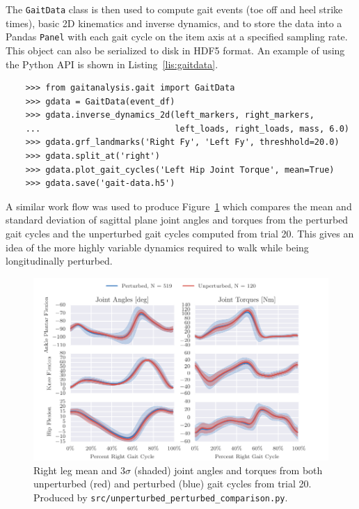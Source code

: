 \documentclass[fleqn,12pt]{wlpeerj}
\begin{document}
The \verb|GaitData| class is then used to compute gait events (toe off and heel
strike times), basic 2D kinematics and inverse dynamics, and to store the data
into a Pandas \verb|Panel| with each gait cycle on the item axis at a specified
sampling rate. This object can also be serialized to disk in HDF5 format. An
example of using the Python API is shown in Listing~\ref{lis:gaitdata}.
%
\begin{listing}
  \begin{verbatim}
    >>> from gaitanalysis.gait import GaitData
    >>> gdata = GaitData(event_df)
    >>> gdata.inverse_dynamics_2d(left_markers, right_markers,
    ...                           left_loads, right_loads, mass, 6.0)
    >>> gdata.grf_landmarks('Right Fy', 'Left Fy', threshhold=20.0)
    >>> gdata.split_at('right')
    >>> gdata.plot_gait_cycles('Left Hip Joint Torque', mean=True)
    >>> gdata.save('gait-data.h5')
  \end{verbatim}
  \cprotect\caption{Python interpreter session showing how one could use the
    \verb|GaitData| class to load in the result of \verb|DFlowData| and compute
    the inverse dynamics (joint angles and torques), identify the gait events
    (e.g. heel strikes), split the data with respect to the gait events into a
    Pandas \verb|Panel|, plot the mean and standard deviation of one time
    history with respect to the gait cycles, and save the data to disk.}
  \label{lis:gaitdata}
\end{listing}

A similar work flow was used to produce Figure~\ref{fig:angle-torque-comparison}
which compares the mean and standard deviation of sagittal plane joint angles
and torques from the perturbed gait cycles and the unperturbed gait cycles
computed from trial 20. This gives an idea of the more highly variable dynamics
required to walk while being longitudinally perturbed.
%
\begin{figure}
  \centering
  \includegraphics{figures/unperturbed-perturbed-comparison.pdf}
  \cprotect\caption{Right leg mean and $3\sigma$ (shaded) joint angles and
    torques from both unperturbed (red) and perturbed (blue) gait cycles
    from trial 20. Produced by \verb|src/unperturbed_perturbed_comparison.py|.}
  \label{fig:angle-torque-comparison}
\end{figure}
\end{document}
